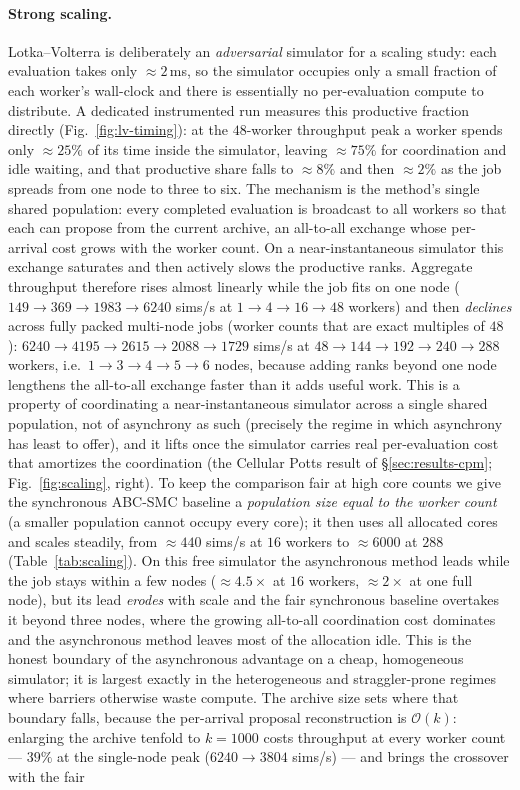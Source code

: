 \paragraph{Strong scaling.} Lotka--Volterra is deliberately an \emph{adversarial} simulator for a scaling study: each evaluation takes only $\approx 2$\,ms, so the simulator occupies only a small fraction of each worker's wall-clock and there is essentially no per-evaluation compute to distribute. A dedicated instrumented run measures this productive fraction directly (Fig.~\ref{fig:lv-timing}): at the $48$-worker throughput peak a worker spends only ${\approx}25\%$ of its time inside the simulator, leaving ${\approx}75\%$ for coordination and idle waiting, and that productive share falls to ${\approx}8\%$ and then ${\approx}2\%$ as the job spreads from one node to three to six. The mechanism is the method's single shared population: every completed evaluation is broadcast to all workers so that each can propose from the current archive, an all-to-all exchange whose per-arrival cost grows with the worker count. On a near-instantaneous simulator this exchange saturates and then actively slows the productive ranks. Aggregate throughput therefore rises almost linearly while the job fits on one node ($149\to369\to1983\to6240$ sims/s at $1\to4\to16\to48$ workers) and then \emph{declines} across fully packed multi-node jobs (worker counts that are exact multiples of $48$): $6240\to4195\to2615\to2088\to1729$ sims/s at $48\to144\to192\to240\to288$ workers, i.e.\ $1\to3\to4\to5\to6$ nodes, because adding ranks beyond one node lengthens the all-to-all exchange faster than it adds useful work. This is a property of coordinating a near-instantaneous simulator across a single shared population, not of asynchrony as such (precisely the regime in which asynchrony has least to offer), and it lifts once the simulator carries real per-evaluation cost that amortizes the coordination (the Cellular Potts result of \S\ref{sec:results-cpm}; Fig.~\ref{fig:scaling}, right). To keep the comparison fair at high core counts we give the synchronous ABC-SMC baseline a \emph{population size equal to the worker count} (a smaller population cannot occupy every core); it then uses all allocated cores and scales steadily, from ${\approx}440$ sims/s at $16$ workers to ${\approx}6000$ at $288$ (Table~\ref{tab:scaling}). On this free simulator the asynchronous method leads while the job stays within a few nodes (${\approx}4.5\times$ at $16$ workers, ${\approx}2\times$ at one full node), but its lead \emph{erodes} with scale and the fair synchronous baseline overtakes it beyond three nodes, where the growing all-to-all coordination cost dominates and the asynchronous method leaves most of the allocation idle. This is the honest boundary of the asynchronous advantage on a cheap, homogeneous simulator; it is largest exactly in the heterogeneous and straggler-prone regimes where barriers otherwise waste compute. The archive size sets where that boundary falls, because the per-arrival proposal reconstruction is $\mathcal{O}(k)$: enlarging the archive tenfold to $k=1000$ costs throughput at every worker count --- $39\%$ at the single-node peak ($6240\to3804$ sims/s) --- and brings the crossover with the fair 